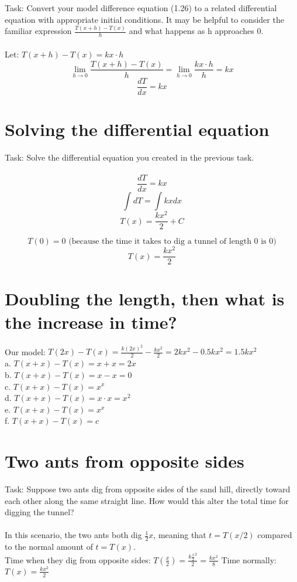 \documentclass{report}
\begin{document}
Task: Convert your model difference equation (1.26) to a related differential equation with appropriate initial conditions. It may be helpful to consider the familiar expression $\frac{T(x+h)-T(x)}{h}$ and what happens as h approaches 0. \\ \\
Let: $ T(x + h ) - T(x) = kx \cdot h $ \\
$$ \lim_{h \to 0} \frac{T(x+h)-T(x)}{h} = \lim_{h \to 0} \frac{kx \cdot h}{h} = kx $$
$$ \frac{dT}{dx} = kx $$

\section*{Solving the differential equation}
Task: Solve the differential equation you created in the previous task. \\ \\

$$ \frac{dT}{dx} = kx $$ 
$$ \int dT = \int kx dx $$ 
$$ T(x) = \frac{kx^2}{2} + C $$ 

$$ T(0) = 0 \text{ (because the time it takes to dig a tunnel of length 0 is 0)} $$
$$ T(x) = \frac{kx^2}{2} $$

\section*{Doubling the length, then what is the increase in time?}

Our model: $ T(2x) - T(x) = \frac{k(2x)^2}{2} - \frac{kx^2}{2} =  2kx^2 - 0.5kx^2 = 1.5kx^2 $ \\
a. $ T(x+x) - T(x) = x + x = 2x $ \\
b. $ T(x+x) - T(x) = x - x = 0 $ \\
c. $ T(x+x) - T(x) = x^x $ \\
d. $ T(x+x) - T(x) = x \cdot x = x^2 $ \\
e. $ T(x+x) - T(x) = x^x $ \\
f. $ T(x+x) - T(x) = c $ \\

\section*{Two ants from opposite sides}
Task: Suppose two ants dig from opposite sides of the sand hill, directly toward each other along the same straight line. How would this alter the total time for digging the tunnel? \\ \\ 
In this scenario, the two ants both dig $ \frac{1}{2} x $, meaning that $t = T(x/2)$ compared to the normal amount of $ t = T(x) $. \\
Time when they dig from opposite sides: $ T(\frac{x}{2}) = \frac{k \frac{x}{2}^2}{2} = \frac{kx^2}{8} $ 
Time normally: $T(x) = \frac{kx^2}{2} $ 
\end{document}
